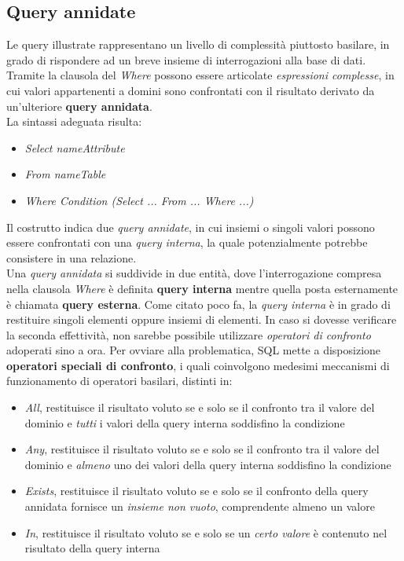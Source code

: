 \documentclass{article}
\begin{document}
\subsection*{Query annidate}
\large
Le query illustrate rappresentano un livello di complessità piuttosto basilare, in grado di rispondere ad un breve insieme di interrogazioni alla base di dati. Tramite la clausola del \textit{Where} possono essere articolate \textit{espressioni complesse}, in cui valori appartenenti a domini sono confrontati con il risultato derivato da un'ulteriore \textbf{query annidata}.\\
La sintassi adeguata risulta:
\begin{itemize}[label={ }, leftmargin=1cm]
    \itemsep0em
    \item \textit{Select nameAttribute}
    \item \textit{From nameTable}
    \item \textit{Where Condition (Select ... From ... Where ...)}
\end{itemize}
Il costrutto indica due \textit{query annidate}, in cui insiemi o singoli valori possono essere confrontati con una \textit{query interna}, la quale potenzialmente potrebbe consistere in una relazione.\vspace*{14pt}\\
Una \textit{query annidata} si suddivide in due entità, dove l'interrogazione compresa nella clausola \textit{Where} è definita \textbf{query interna} mentre quella posta esternamente è chiamata \textbf{query esterna}. Come citato poco fa, la \textit{query interna} è in grado di restituire singoli elementi oppure insiemi di elementi. In caso si dovesse verificare la seconda effettività, non sarebbe possibile utilizzare \textit{operatori di confronto} adoperati sino a ora. Per ovviare alla problematica, SQL mette a disposizione \textbf{operatori speciali di confronto}, i quali coinvolgono medesimi meccanismi di funzionamento di operatori basilari, distinti in:
\begin{itemize}[label={-}]
    \itemsep0em
    \item \textit{All}, restituisce il risultato voluto se e solo se il confronto tra il valore del dominio e \textit{tutti} i valori della query interna soddisfino la condizione
    \item \textit{Any}, restituisce il risultato voluto se e solo se il confronto tra il valore del dominio e \textit{almeno} uno dei valori della query interna soddisfino la condizione
    \item \textit{Exists}, restituisce il risultato voluto se e solo se il confronto della query annidata fornisce un \textit{insieme non vuoto}, comprendente almeno un valore
    \item \textit{In}, restituisce il risultato voluto se e solo se un \textit{certo valore} è contenuto nel risultato della query interna
\end{itemize}
\end{document}
